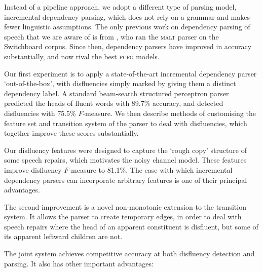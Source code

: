 \documentclass[11pt,letterpaper]{article}
\newcommand{\pcfg}{\textsc{pcfg}\xspace}
\begin{document}
Instead of a pipeline approach, we adopt a different type of parsing model,
incremental dependency parsing,
which does not rely on a grammar and makes fewer linguistic assumptions.
The only previous work on dependency parsing of speech that we are aware of
is from \citet{jorgensen:07}, who ran the \textsc{malt} parser on the Switchboard
corpus. Since then, dependency parsers have improved in accuracy substantially,
and now rival the best \pcfg models.

Our first experiment is to apply a state-of-the-art incremental dependency parser
`out-of-the-box', with disfluencies simply marked by giving them a distinct
dependency label. A standard beam-search structured perceptron parser
\citep{zhang:cl11,zhang:11} predicted the heads of fluent words
with 89.7\% accuracy, and detected disfluencies with 75.5\% $F$-measure.
We then describe methods of customising the feature set and transition system
of the parser to deal with disfluencies, which together improve these scores
substantially.

Our disfluency features were designed to capture the
`rough copy' structure of some speech repairs, which motivates the
\citet{Johnson04a} noisy channel model.  These features improve disfluency
$F$-measure to 81.1\%.  The ease with which
incremental dependency parsers can incorporate arbitrary features is one of
their principal advantages.

The second improvement is a novel non-monotonic extension to the transition
system. It allows the parser to create temporary edges, in order to deal with
speech repairs where the head of an apparent constituent is disfluent, but some
of its apparent leftward children are not.

The joint system achieves competitive accuracy at both disfluency detection and
parsing. It also has other important advantages:
\end{document}
